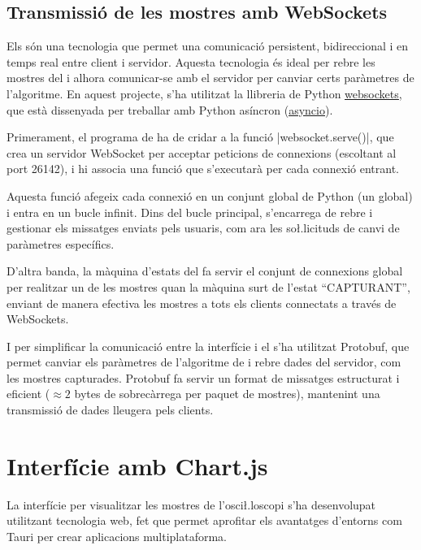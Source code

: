 \documentclass{tfgitic}[2023/07/07]
\begin{document}
\subsection{Transmissió de les mostres amb WebSockets}

Els \cite[WebSockets]{websockets} són una tecnologia que permet una
comunicació persistent, bidireccional i en temps real entre client i
servidor. Aquesta tecnologia és ideal per rebre les mostres del
 i alhora comunicar-se amb el servidor per canviar certs
paràmetres de l'algoritme. En aquest projecte, s'ha utilitzat la
llibreria de Python
\href{https://pypi.org/project/websockets/}{\underline{websockets}},
que està dissenyada per treballar amb Python asíncron
(\href{https://docs.python.org/3/library/asyncio.html}{\underline{asyncio}}).

Primerament, el programa de  ha de cridar a la funció
\ord|websocket.serve()|, que crea un servidor WebSocket per acceptar
peticions de connexions (escoltant al port 26142), i hi associa una
funció que s'executarà per cada connexió entrant.

Aquesta funció afegeix cada connexió en un conjunt global de Python
(un  global) i entra en un bucle infinit. Dins del bucle
principal, s'encarrega de rebre i gestionar els missatges enviats pels
usuaris, com ara les so\l.licituds de canvi de paràmetres específics.

D'altra banda, la màquina d'estats del  fa servir el
conjunt de connexions global per realitzar un  de les
mostres quan la màquina surt de l'estat ``CAPTURANT'', enviant de
manera efectiva les mostres a tots els clients connectats a través de
WebSockets.

I per simplificar la comunicació entre la interfície i el
 s'ha utilitzat Protobuf, que permet canviar els
paràmetres de l'algoritme de  i rebre dades del servidor,
com les mostres capturades. Protobuf fa servir un format de missatges
estructurat i eficient ($\approx 2$ bytes de sobrecàrrega per paquet de
mostres), mantenint una transmissió de dades lleugera pels clients.

\section{Interfície amb Chart.js}

La interfície per visualitzar les mostres de l'osci\l.loscopi s'ha
desenvolupat utilitzant tecnologia web, fet que permet aprofitar els
avantatges d'entorns com Tauri per crear aplicacions multiplataforma.
\end{document}

